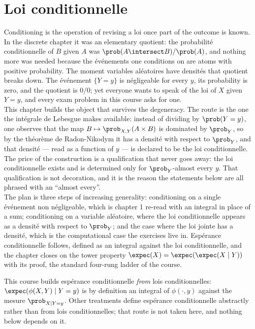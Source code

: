 \section{Loi conditionnelle}

Conditioning is the operation of revising a loi once part of the outcome is
known. In the discrete chapter it was an elementary quotient: the probabilité
conditionnelle of $B$ given $A$ was $\prob(A \intersect B)/\prob(A)$, and nothing
more was needed because the événements one conditions on are atoms with positive
probability. The moment variables aléatoires have densités that quotient breaks
down. The événement $\{Y = y\}$ is négligeable for every $y$, its probability is
zero, and the quotient is $0/0$; yet everyone wants to speak of the loi of $X$
given $Y = y$, and every exam problem in this course asks for one.\\

This chapter builds the object that survives the degeneracy. The route is the
one the intégrale de Lebesgue makes available: instead of dividing by
$\prob(Y = y)$, one observes that the map $B \mapsto \prob_{X,Y}(A \times B)$ is
dominated by $\prob_{Y}$, so by the théorème de Radon-Nikodym it has a densité with
respect to $\prob_{Y}$, and that densité --- read as a function of $y$ --- is
declared to be the loi conditionnelle. The price of the construction is a
qualification that never goes away: the loi conditionnelle exists and is determined
only for $\prob_{Y}$-almost every $y$. That qualification is not decoration, and it
is the reason the statements below are all phrased with an ``almost every''.\\

The plan is three steps of increasing generality: conditioning on a single
événement non négligeable, which is chapter 1 re-read with an integral in place of a
sum; conditioning on a variable aléatoire, where the loi conditionnelle appears as a
densité with respect to $\prob_{Y}$; and the case where the loi jointe has a
densité, which is the computational case the exercises live in. Espérance
conditionnelle follows, defined as an integral against the loi conditionnelle, and the
chapter closes on the tower property $\expec(X) = \expec(\expec(X \mid Y))$ with
its proof, the standard four-rung ladder of the course.

\begin{remark}
  This course builds espérance conditionnelle \emph{from} lois
  conditionnelles: $\expec(\phi(X,Y) \mid Y = y)$ is by definition an integral
  of $\phi(\cdot,y)$ against the mesure $\prob_{X \mid Y = y}$. Other
  treatments define espérance conditionnelle abstractly rather than from
  lois conditionnelles; that route is not taken here, and nothing below depends
  on it.
\end{remark}

